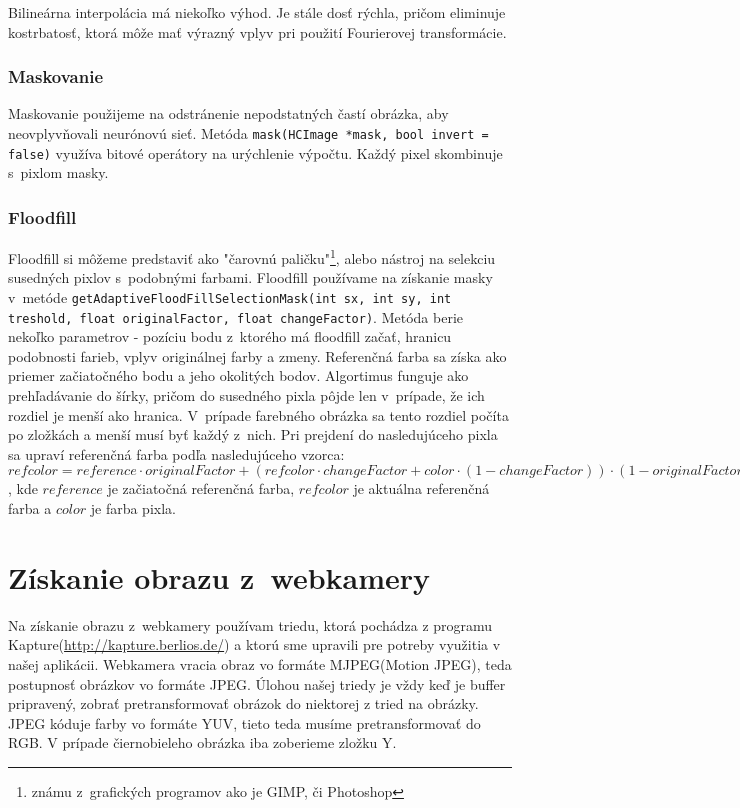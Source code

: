 Bilineárna interpolácia má niekoľko výhod. Je stále dosť rýchla, pričom eliminuje kostrbatosť, ktorá môže mať výrazný vplyv pri použití Fourierovej transformácie.

\subsubsection{Maskovanie}
Maskovanie použijeme na odstránenie nepodstatných častí obrázka, aby neovplyvňovali neurónovú sieť. Metóda {\tt mask(HCImage *mask, bool invert = false)} využíva bitové operátory na urýchlenie výpočtu. Každý pixel skombinuje s~pixlom masky. 

\subsubsection{Floodfill}
Floodfill si môžeme predstaviť ako "čarovnú paličku"\footnote{známu z~grafických programov ako je GIMP, či Photoshop}, alebo nástroj na selekciu susedných pixlov s~podobnými farbami. Floodfill používame na získanie masky v~metóde {\tt getAdaptiveFloodFillSelectionMask(int sx, int sy, int treshold, float originalFactor, float changeFactor)}. Metóda berie nekoľko parametrov - pozíciu bodu z~ktorého má floodfill začať, hranicu podobnosti farieb, vplyv originálnej farby a zmeny. Referenčná farba sa získa ako priemer začiatočného bodu a jeho okolitých bodov. Algortimus funguje ako prehľadávanie do šírky, pričom do susedného pixla pôjde len v~prípade, že ich rozdiel je menší ako hranica. V~prípade farebného obrázka sa tento rozdiel počíta po zložkách a menší musí byť každý z~nich. Pri prejdení do nasledujúceho pixla sa upraví referenčná farba podľa nasledujúceho vzorca: $refcolor = reference \cdot originalFactor + (refcolor\cdot changeFactor+color \cdot (1-changeFactor)) \cdot (1-originalFactor)$, kde $reference$ je začiatočná referenčná farba, $refcolor$ je aktuálna referenčná farba a $color$ je farba pixla.

\section{Získanie obrazu z~webkamery}
Na získanie obrazu z~webkamery používam triedu, ktorá pochádza z programu Kapture(\url{http://kapture.berlios.de/}) a ktorú sme upravili pre potreby využitia v našej aplikácii. Webkamera vracia obraz vo formáte MJPEG(Motion JPEG), teda postupnosť obrázkov vo formáte JPEG. Úlohou našej triedy je vždy keď je buffer pripravený, zobrať pretransformovať  obrázok do niektorej z tried na obrázky. JPEG kóduje farby vo formáte YUV, tieto teda musíme pretransformovať do RGB. V prípade čiernobieleho obrázka iba zoberieme zložku Y.

